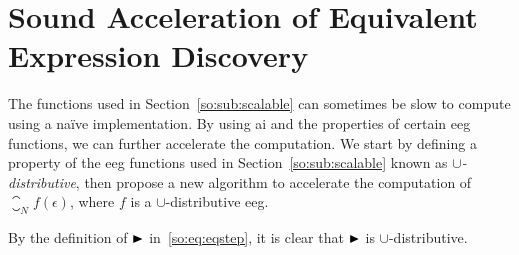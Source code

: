 \chapter{Sound Acceleration of Equivalent Expression Discovery}
\label{app:sound_acceleration}

The functions used in Section~\ref{so:sub:scalable} can sometimes be slow
to compute using a na\"ive implementation.  By using \acrlong{ai} and the
properties of certain \acrfull{eeg} functions, we can further accelerate the
computation.  We start by defining a property of the \gls{eeg} functions
used in Section~\ref{so:sub:scalable} known as \emph{$\cup$-distributive},
then propose a new algorithm to accelerate the computation of $\closure_N f
(\epsilon)$, where $f$ is a $\cup$-distributive \gls{eeg}\@.
\begin{corollary}
    By the definition of $\operatorname{\blacktriangleright}$ in~\eqref{so:eq:eqstep}, it is clear that
    $\operatorname{\blacktriangleright}$ is $\cup$-distributive.
    {}\label{so:cor:union}
\end{corollary}

